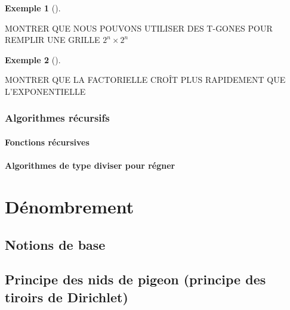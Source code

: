 \documentclass[
  letterpaper,
]{scrbook}
\theoremstyle{plain}
\theoremstyle{definition}
\newtheorem{example}{Exemple}[chapter]
\theoremstyle{definition}
\theoremstyle{remark}
\begin{document}
\leavevmode{}%
\begin{example}[]\label{exm-space-filling-shapes}

MONTRER QUE NOUS POUVONS UTILISER DES T-GONES POUR REMPLIR UNE GRILLE
\(2^n \times 2^n\)

\end{example}

\leavevmode{}%
\begin{example}[]\label{exm-exponential-vs-factorial}

MONTRER QUE LA FACTORIELLE CROÎT PLUS RAPIDEMENT QUE L'EXPONENTIELLE

\end{example}

\hypertarget{algorithmes-ruxe9cursifs}{%
\subsection{Algorithmes récursifs}\label{algorithmes-ruxe9cursifs}}

\hypertarget{fonctions-ruxe9cursives}{%
\subsubsection{Fonctions récursives}\label{fonctions-ruxe9cursives}}

\hypertarget{algorithmes-de-type-diviser-pour-ruxe9gner}{%
\subsubsection{Algorithmes de type diviser pour
régner}\label{algorithmes-de-type-diviser-pour-ruxe9gner}}


\hypertarget{duxe9nombrement}{%
\chapter{Dénombrement}\label{duxe9nombrement}}

\hypertarget{notions-de-base}{%
\section{Notions de base}\label{notions-de-base}}

\hypertarget{principe-des-nids-de-pigeon-principe-des-tiroirs-de-dirichlet}{%
\section{Principe des nids de pigeon (principe des tiroirs de
Dirichlet)}\label{principe-des-nids-de-pigeon-principe-des-tiroirs-de-dirichlet}}
\end{document}
